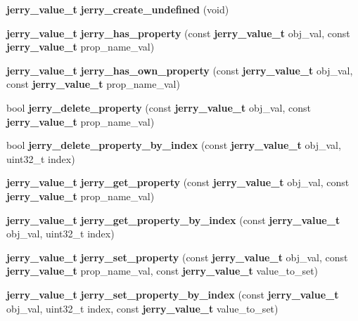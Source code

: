 \begin{DoxyCompactItemize}
\mbox{\label{group___core_gabc7965375b9a7d562b1cc179efbf8484}} 
\textbf{ jerry\+\_\+value\+\_\+t} {\bfseries jerry\+\_\+create\+\_\+undefined} (void)
\item 
\textbf{ jerry\+\_\+value\+\_\+t} \textbf{ jerry\+\_\+has\+\_\+property} (const \textbf{ jerry\+\_\+value\+\_\+t} obj\+\_\+val, const \textbf{ jerry\+\_\+value\+\_\+t} prop\+\_\+name\+\_\+val)
\item 
\mbox{\label{group___core_ga9b599b628c4c5e62bbc88a8d168b76dc}} 
\textbf{ jerry\+\_\+value\+\_\+t} {\bfseries jerry\+\_\+has\+\_\+own\+\_\+property} (const \textbf{ jerry\+\_\+value\+\_\+t} obj\+\_\+val, const \textbf{ jerry\+\_\+value\+\_\+t} prop\+\_\+name\+\_\+val)
\item 
\mbox{\label{group___core_ga2939735fb8a636c6968d52361f6faa0a}} 
bool {\bfseries jerry\+\_\+delete\+\_\+property} (const \textbf{ jerry\+\_\+value\+\_\+t} obj\+\_\+val, const \textbf{ jerry\+\_\+value\+\_\+t} prop\+\_\+name\+\_\+val)
\item 
\mbox{\label{group___core_ga50ac28f52f76b4378136a713ce77b7a8}} 
bool {\bfseries jerry\+\_\+delete\+\_\+property\+\_\+by\+\_\+index} (const \textbf{ jerry\+\_\+value\+\_\+t} obj\+\_\+val, uint32\+\_\+t index)
\item 
\mbox{\label{group___core_gadef74db83c837adf3a0ab5de4de7fbac}} 
\textbf{ jerry\+\_\+value\+\_\+t} {\bfseries jerry\+\_\+get\+\_\+property} (const \textbf{ jerry\+\_\+value\+\_\+t} obj\+\_\+val, const \textbf{ jerry\+\_\+value\+\_\+t} prop\+\_\+name\+\_\+val)
\item 
\mbox{\label{group___core_ga037485a91abca9120dca18ec6347d12b}} 
\textbf{ jerry\+\_\+value\+\_\+t} {\bfseries jerry\+\_\+get\+\_\+property\+\_\+by\+\_\+index} (const \textbf{ jerry\+\_\+value\+\_\+t} obj\+\_\+val, uint32\+\_\+t index)
\item 
\mbox{\label{group___core_ga6734266e9a60a671f55f45528edcef43}} 
\textbf{ jerry\+\_\+value\+\_\+t} {\bfseries jerry\+\_\+set\+\_\+property} (const \textbf{ jerry\+\_\+value\+\_\+t} obj\+\_\+val, const \textbf{ jerry\+\_\+value\+\_\+t} prop\+\_\+name\+\_\+val, const \textbf{ jerry\+\_\+value\+\_\+t} value\+\_\+to\+\_\+set)
\item 
\mbox{\label{group___core_gadbdb2be07f8d05158cd2a77866240d8f}} 
\textbf{ jerry\+\_\+value\+\_\+t} {\bfseries jerry\+\_\+set\+\_\+property\+\_\+by\+\_\+index} (const \textbf{ jerry\+\_\+value\+\_\+t} obj\+\_\+val, uint32\+\_\+t index, const \textbf{ jerry\+\_\+value\+\_\+t} value\+\_\+to\+\_\+set)
\item 
\mbox{\label{group___core_gaf2a523470791fc7e59a85c3abedb3a91}} 

\end{DoxyCompactItemize}
